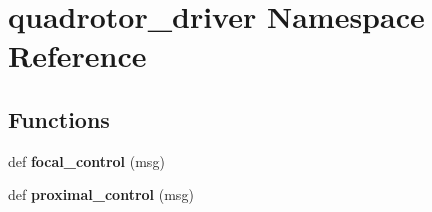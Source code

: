 \hypertarget{namespacequadrotor__driver}{}\section{quadrotor\+\_\+driver Namespace Reference}
\label{namespacequadrotor__driver}
\subsection*{Functions}
\begin{DoxyCompactItemize}
\item 
\mbox{\label{namespacequadrotor__driver_ad9bac97ee58c1030274c90f7b78ac498}} 
def {\bfseries focal\+\_\+control} (msg)
\item 
\mbox{\label{namespacequadrotor__driver_ac0b8990e733f5d837acaba7cdbe2ffbe}} 
def {\bfseries proximal\+\_\+control} (msg)
\end{DoxyCompactItemize}
